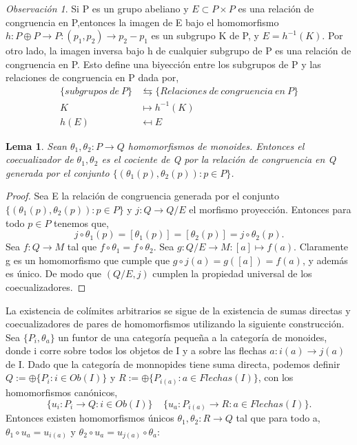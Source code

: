 \documentclass[12pt,spanish]{amsart}
\newtheorem{lem}[Theorem]{Lema}
\theoremstyle{definition}
\theoremstyle{remark}
\newtheorem{obs}[Theorem]{Observación}
\begin{document}
\begin{obs}
 Si P es un grupo abeliano y $E \subset P\times P$ es una relación de congruencia en P,entonces la imagen de E bajo el homomorfismo $h:P\oplus P \to P:(p_{1},p_{2}) \to p_{2}-p_{1}$ es un subgrupo K de P, y $E=h^{-1}(K)$. Por otro lado, la imagen inversa bajo h de cualquier subgrupo  de P es una relación de congruencia en P. Esto define una biyección entre los subgrupos de P y las relaciones de congruencia en P dada por,
\begin{equation*}
\begin{split}
\{subgrupos~de~P\} &\leftrightarrows \{Relaciones~de~congruencia~en~P\} \\
K &\mapsto h^{-1}(K) \\
h(E) &\mapsfrom E
\end{split}
\end{equation*}
\end{obs}

\begin{lem}
Sean $\theta_{1},\theta_{2}: P \to Q$ homomorfismos de monoides. Entonces el coecualizador de $\theta_{1},\theta_{2}$ es el cociente de Q por la relación de congruencia en Q generada por el conjunto $\{(\theta_{1}(p),\theta_{2}(p)):p\in P\}$.
\end{lem}

\begin{proof}
Sea E la relación de congruencia generada por el conjunto $\{(\theta_{1}(p),\theta_{2}(p)):p\in P\}$ y $j:Q \to Q/E$ el morfismo proyección. Entonces para todo $p\in P$ tenemos que,
$$j\circ \theta_{1}(p)=[\theta_{1}(p)]=[\theta_{2}(p)]= j\circ \theta_{2}(p).$$
Sea $f:Q \to M$ tal que $f\circ \theta_{1}= f \circ \theta_{2}$. Sea $g:Q/E \to M: [a] \mapsto f(a)$. Claramente g es un homomorfismo que cumple que $g\circ j(a)=g([a])=f(a)$, y además es único. De modo que $(Q/E,j)$ cumplen la propiedad universal de los coecualizadores. 
\end{proof}



La existencia de colímites arbitrarios se sigue de la existencia de sumas directas y coecualizadores de pares de homomorfismos utilizando la siguiente construcción. Sea $\{P_{i},\theta_{a}\}$ un funtor de una categoría pequeña a la categoría de monoides, donde i corre sobre todos los objetos de I y a sobre las flechas $a:i(a) \to j(a)$ de I. Dado que la categoría de monnopides tiene suma directa, podemos definir $Q:= \oplus \{P_{i}:i\in Ob(I)\}$ y $R:=\oplus \{P_{i(a)}:a\in Flechas(I)\}$, con los homomorfismos canónicos, 
$$\{u_{i}:P_{i}\to Q:i \in Ob(I)\} ~~~~~ \{u_{a}:P_{i(a)} \to R: a\in Flechas(I)\}.$$ 
Entonces existen homomorfismos únicos $\theta_{1},\theta_{2}:R \to Q$ tal que para todo a, $\theta_{1} \circ u_{a}= u_{i(a)}$ y $\theta_{2} \circ u_{a}= u_{j(a)}\circ \theta_{a}:$ \\
\end{document}
